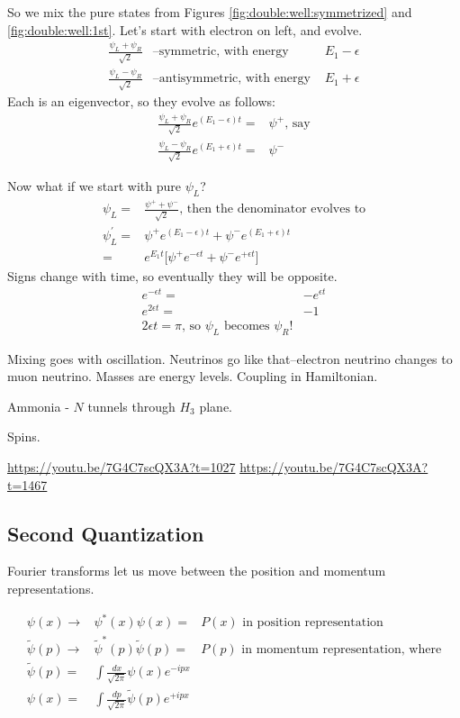 \documentclass[]{article}
\begin{document}
So we mix the pure states from Figures \ref{fig:double:well:symmetrized} and \ref{fig:double:well:1st}. Let's start with electron on left, and evolve.
\begin{align*}
\frac{\psi_L+\psi_R}{\sqrt{2}}& \text{--symmetric, with energy }& E_1-\epsilon\\
\frac{\psi_L-\psi_R}{\sqrt{2}}& \text{--antisymmetric, with energy }& E_1+\epsilon
\end{align*}
Each is an eigenvector, so they evolve as follows:
\begin{align*}
\frac{\psi_L+\psi_R}{\sqrt{2}} e^{(E_1-\epsilon)t}=&\psi^+ \text{, say}\\
\frac{\psi_L-\psi_R}{\sqrt{2}}e^{(E_1+\epsilon)t}=&\psi^-
\end{align*}

Now what if we start with pure $\psi_L$?
\begin{align*}
	\psi_L =& \frac{\psi^+ + \psi^-}{\sqrt{2}}\text{, then the denominator evolves to}\\
	\psi_L^\prime =&\psi^+ e^{(E_1-\epsilon)t} + \psi^- e^{(E_1+\epsilon)t}\\
	=&e^{E_1 t}\big[\psi^+ e^{-\epsilon t} + \psi^- e^{+\epsilon t}\big]
\end{align*}
Signs change with time, so eventually they will be opposite.
\begin{align*}
e^{-\epsilon t} =& - e^{\epsilon t}\\
e^{2 \epsilon t}=&-1\\
2 \epsilon t = \pi \text{, so $\psi_L$ becomes $\psi_R$!}
\end{align*}

Mixing goes with oscillation. Neutrinos go like that--electron neutrino changes to muon neutrino. Masses are energy levels. Coupling in Hamiltonian.

Ammonia - $N$ tunnels through $H_3$ plane. 

Spins.

\url{https://youtu.be/7G4C7scQX3A?t=1027}
\url{https://youtu.be/7G4C7scQX3A?t=1467}

\subsection{Second Quantization}

Fourier transforms let us move between the position and momentum representations.

\begin{align*}
\psi(x) \rightarrow& \psi^*(x)\psi(x)=&P(x) \text{ in position representation}\\
\widetilde{\psi}(p) \rightarrow& \widetilde{\psi}^*(p) \widetilde{\psi}(p) =&P(p) \text{ in momentum representation, where}\\
\widetilde{\psi}(p) =& \int \frac{dx}{\sqrt{2\pi}} \psi(x) e^{-i p x}\\
\psi(x) =& \int \frac{dp}{\sqrt{2\pi}} \widetilde{\psi}(p) e^{+i p x}
\end{align*}
\end{document}
